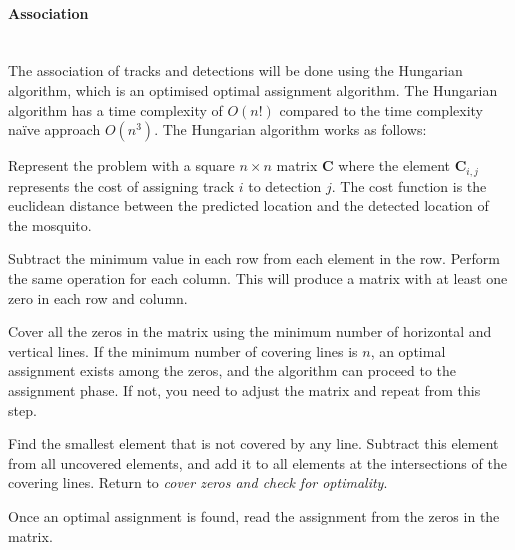 \paragraph{Association}\mbox{}\\
The association of tracks and detections will be done using the Hungarian algorithm, which is an optimised optimal assignment algorithm. The Hungarian algorithm has a time complexity of $O\left(n!\right)$ compared to the time complexity na\"ive approach $O\left(n^3\right)$. The Hungarian algorithm works as follows:
\begin{description}[style=nextline]
  \item[Generate a cost matrix.] Represent the problem with a square $n \times n$ matrix $\mathbf{C}$ where the element $\mathbf{C}_{i,j}$ represents the cost of assigning track $i$ to detection $j$. The cost function is the euclidean distance between the predicted location and the detected location of the mosquito.
  \item[Row and column reduction.] Subtract the minimum value in each row from each element in the row. Perform the same operation for each column. This will produce a matrix with at least one zero in each row and column.
  \item[Cover zeros and check for optimality.] Cover all the zeros in the matrix using the minimum number of horizontal and vertical lines. If the minimum number of covering lines is $n$, an optimal assignment exists among the zeros, and the algorithm can proceed to the assignment phase. If not, you need to adjust the matrix and repeat from this step.
  \item[Adjust the matrix.] Find the smallest element that is not covered by any line. Subtract this element from all uncovered elements, and add it to all elements at the intersections of the covering lines. Return to \textit{cover zeros and check for optimality}.
  \item[Assignment.] Once an optimal assignment is found, read the assignment from the zeros in the matrix.
\end{description}



